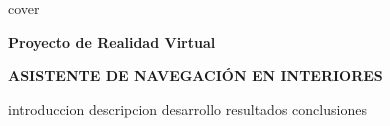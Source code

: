 \documentclass{article}
\begin{document}

{cover}
\newpage

\pagestyle{fancy}
\fancyhf{}
\setlength\headheight{1.5cm}

\singlespacing

\begin{center}
\large
\textbf{Proyecto de Realidad Virtual}

\Large
\textbf{ASISTENTE DE NAVEGACIÓN EN INTERIORES}
\end{center}

\doublespacing
\bigskip
\tableofcontents
\clearpage

\onehalfspacing
{introduccion}
\clearpage
{descripcion}
\clearpage
{desarrollo}
\clearpage
{resultados}
\clearpage
{conclusiones}
\clearpage

\doublespacing
\printbibliography
\end{document}
